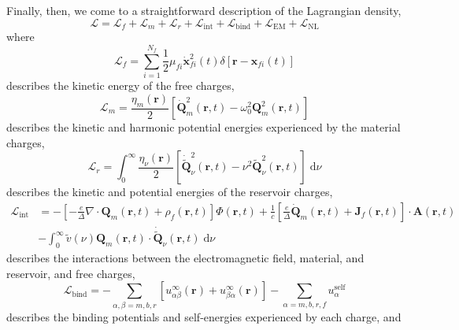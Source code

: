 \documentclass{article}
\begin{document}
Finally, then, we come to a straightforward description of the Lagrangian density,
\begin{equation}
\mathcal{L} = \mathcal{L}_f + \mathcal{L}_m + \mathcal{L}_r + \mathcal{L}_\mathrm{int} + \mathcal{L}_\mathrm{bind} + \mathcal{L}_\mathrm{EM} + \mathcal{L}_\mathrm{NL}
\end{equation}
where
\begin{equation}
\mathcal{L}_f = \sum_{i = 1}^{N_f}\frac{1}{2}\mu_{fi}\dot{\mathbf{x}}_{fi}^2(t)\delta[\mathbf{r} - \mathbf{x}_{fi}(t)]
\end{equation}
describes the kinetic energy of the free charges,
\begin{equation}
\mathcal{L}_m = \frac{\eta_m(\mathbf{r})}{2}\left[\dot{\mathbf{Q}}_m^2(\mathbf{r},t) - \omega_0^2\mathbf{Q}_m^2(\mathbf{r},t)\right]
\end{equation}
describes the kinetic and harmonic potential energies experienced by the material charges,
\begin{equation}
\mathcal{L}_r = \int_0^\infty\frac{\eta_\nu(\mathbf{r})}{2}\left[\dot{\tilde{\mathbf{Q}}}_\nu^2(\mathbf{r},t) - \nu^2\tilde{\mathbf{Q}}_\nu^2(\mathbf{r},t)\right]\;\mathrm{d}\nu
\end{equation}
describes the kinetic and potential energies of the reservoir charges,
\begin{equation}
\begin{split}
\mathcal{L}_\mathrm{int} &= -\left[-\frac{e}{\Delta}\nabla\cdot\mathbf{Q}_m(\mathbf{r},t) + \rho_f(\mathbf{r},t)\right]\Phi(\mathbf{r},t) + \frac{1}{c}\left[\frac{e}{\Delta}\dot{\mathbf{Q}}_m(\mathbf{r},t) + \mathbf{J}_f(\mathbf{r},t)\right]\cdot\mathbf{A}(\mathbf{r},t)\\
&- \int_0^\infty \tilde{v}(\nu)\mathbf{Q}_m(\mathbf{r},t)\cdot\dot{\tilde{\mathbf{Q}}}_\nu(\mathbf{r},t)\;\mathrm{d}\nu
\end{split}
\end{equation}
describes the interactions between the electromagnetic field, material, and reservoir, and free charges,
\begin{equation}
\mathcal{L}_\mathrm{bind} = -\sum_{\alpha,\beta = m,b,r}\left[u_{\alpha\beta}^\infty(\mathbf{r}) + u_{\beta\alpha}^\infty(\mathbf{r})\right] - \sum_{\alpha = m,b,r,f}u_\alpha^\mathrm{self}
\end{equation}
describes the binding potentials and self-energies experienced by each charge, and
\end{document}
